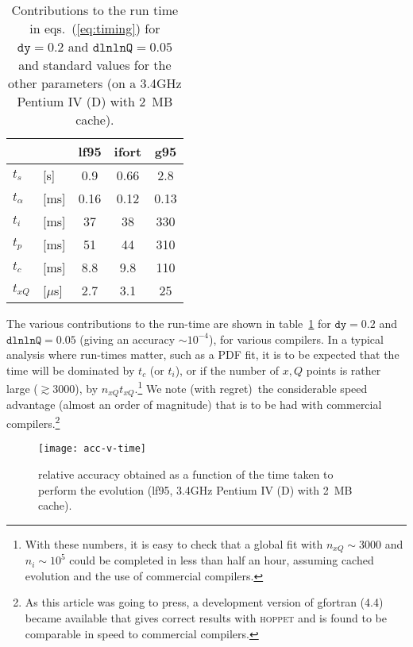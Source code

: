 \documentclass[12pt]{article}
\newcommand{\dy}{\ttt{dy}}
\newcommand{\dlnlnQ}{\ttt{dlnlnQ}}
\newcommand{\hoppet}{\textsc{hoppet}\xspace}
\newcommand{\ttt}[1]{\texttt{#1}}
\begin{document}
\begin{table}
  \centering
  \begin{tabular}{|ll|c|c|c|}\hline
          &&     lf95  &  ifort   & g95    \\\hline
   $t_s$ &[s]  &  0.9  &  0.66    & 2.8    \\
   $t_\alpha$ & [ms]                
               &  0.16 &  0.12    & 0.13   \\
   $t_i$ &[ms] &  37   &   38     & 330    \\
   $t_p$ &[ms] &  51   &   44     & 310    \\
   $t_c$ &[ms] &  8.8  &   9.8    & 110    \\
   $t_{xQ}$ &[$\mu$s]           
               &  2.7  &   3.1    &  25    \\
   \hline
  \end{tabular}
  \caption{Contributions to the run time in eqs.~(\ref{eq:timing})
 for    $\dy=0.2$ and 
    $\dlnlnQ=0.05$ and standard values for the other parameters 
    (on a 3.4GHz Pentium IV (D) with 2~MB cache).}
  \label{tab:timings}
\end{table}

The various contributions to the run-time are shown in
table~\ref{tab:timings} for $\dy=0.2$ and $\dlnlnQ=0.05$ (giving an
accuracy $\sim 10^{-4}$), for various compilers.  In a typical
analysis where run-times matter, such as a PDF fit, it is to be
expected that the time will be dominated by $t_c$ (or $t_i$), or if
the number of $x,Q$ points is rather large ($\gtrsim 3000$), by
$n_{xQ} t_{xQ}$.\footnote{
With these numbers, it is easy to check that a global fit with
$n_{xQ}\sim 3000$ and $n_i\sim 10^5$ could be completed
in less than half an hour, assuming cached evolution
and the use of commercial compilers.} We note (with regret)\ the
considerable speed advantage (almost an order
of magnitude) that is to be had with commercial
compilers.\footnote{As this article was going to press, a development
  version of gfortran (4.4) became available that gives correct
  results with \hoppet and is found to be comparable in speed to
  commercial compilers.}

\begin{figure}
  \centering
  \texttt{[image: acc-v-time]}%
  \caption{relative accuracy obtained as a function of the time taken
    to perform the evolution (lf95, 3.4GHz Pentium IV (D) with 2~MB
    cache).}
  \label{fig:acc-v-time}
\end{figure}
\end{document}
